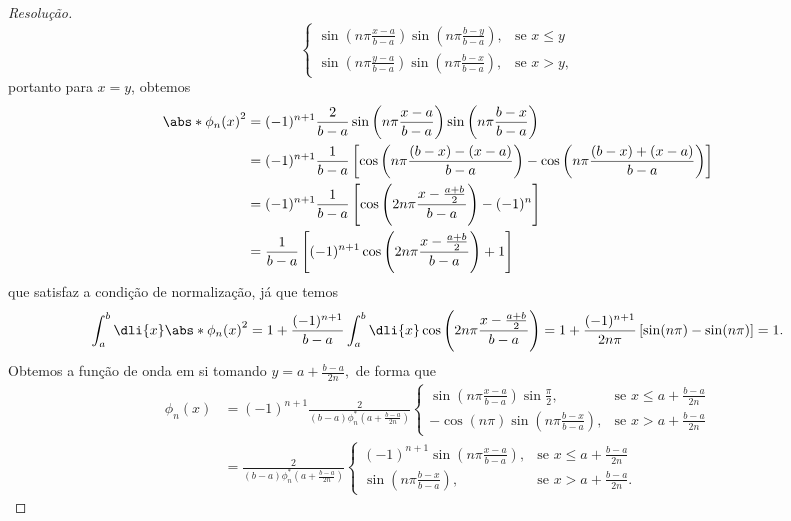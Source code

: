 \begin{proof}[Resolução]
\begin{equation*}
\begin{cases}
         \displaystyle \sin\left(n\pi \frac{x - a}{b-a}\right)\sin\left(n\pi \frac{b - y}{b-a}\right),&\text{se }x \leq y\\
         \displaystyle \sin\left(n\pi \frac{y - a}{b-a}\right)\sin\left(n\pi \frac{b - x}{b-a}\right),&\text{se }x > y,
      \end{cases}
   \end{equation*}
   portanto para \(x = y\), obtemos
   \begin{align*}
      \abs*{\phi_n(x)}^2 &= (-1)^{n+1} \frac{2}{b - a} \sin\left(n\pi \frac{x - a}{b-a}\right) \sin\left(n\pi \frac{b - x}{b-a}\right)\\
                         &= (-1)^{n+1} \frac{1}{b-a} \left[\cos\left(n\pi\frac{(b - x) - (x - a)}{b-a}\right) - \cos\left(n\pi\frac{(b - x) + (x - a)}{b - a}\right)\right]\\
                         &= (-1)^{n+1} \frac{1}{b - a}\left[\cos\left(2n\pi \frac{x - \frac{a + b}{2}}{b-a}\right)- (-1)^{n}\right]\\
                         &= \frac{1}{b - a} \left[(-1)^{n+1}\cos\left(2 n \pi \frac{x - \frac{a + b}{2}}{b - a}\right) + 1\right]
   \end{align*}
   que satisfaz a condição de normalização, já que temos
   \begin{equation*}
      \int_a^b \dli{x} \abs*{\phi_n(x)}^2 = 1 + \frac{(-1)^{n+1}}{b - a}\int_a^b\dli{x} \cos\left(2 n \pi \frac{x - \frac{a + b}{2}}{b - a}\right) = 1 + \frac{(-1)^{n+1}}{2 n \pi} \left[\sin(n \pi) - \sin(n \pi)\right] = 1.
   \end{equation*}
   Obtemos a função de onda em si tomando \(y = a + \frac{b - a}{2n},\) de forma que
   \begin{align*}
      \phi_n(x) &= (-1)^{n + 1} \frac{2}{(b-a) \phi_n^*\left(a + \frac{b-a}{2n}\right)} \begin{cases}
         \displaystyle \sin\left(n\pi \frac{x - a}{b-a}\right)\sin\frac\pi2,&\text{se }x \leq a+\frac{b-a}{2n}\\
         \displaystyle -\cos(n\pi)\sin\left(n\pi \frac{b - x}{b-a}\right),&\text{se }x > a+\frac{b-a}{2n}
      \end{cases}\\
      &=  \frac{2}{(b-a) \phi_n^*\left(a + \frac{b-a}{2n}\right)} \begin{cases}
         \displaystyle (-1)^{n + 1}\sin\left(n\pi \frac{x - a}{b-a}\right),&\text{se }x \leq a+\frac{b-a}{2n}\\
         \displaystyle \sin\left(n\pi \frac{b - x}{b-a}\right),&\text{se }x > a+\frac{b-a}{2n}.

\end{cases}
\end{align*}
\end{proof}
